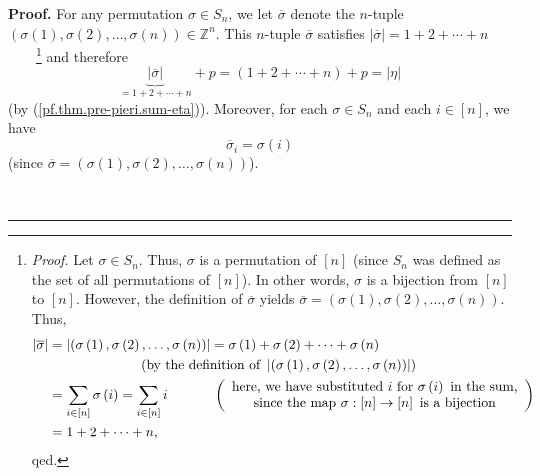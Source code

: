 \documentclass[numbers=enddot,12pt,final,onecolumn,notitlepage,english]{scrartcl}%
\theoremstyle{definition}
\newenvironment{proof}[1][Proof]{\noindent\textbf{#1.} }{\ \rule{0.5em}{0.5em}}
\let\sumnonlimits\sum
\renewcommand{\sum}{\sumnonlimits\limits}
\newenvironment{verlong}{}{}
\begin{document}
\begin{verlong}
\begin{proof}
For any permutation $\sigma\in S_{n}$, we let $\overline{\sigma}$ denote the
$n$-tuple $\left(  \sigma\left(  1\right)  ,\sigma\left(  2\right)
,\ldots,\sigma\left(  n\right)  \right)  \in\mathbb{Z}^{n}$. This $n$-tuple
$\overline{\sigma}$ satisfies $\left\vert \overline{\sigma}\right\vert
=1+2+\cdots+n$\ \ \ \ \footnote{\textit{Proof.} Let $\sigma\in S_{n}$. Thus,
$\sigma$ is a permutation of $\left[  n\right]  $ (since $S_{n}$ was defined
as the set of all permutations of $\left[  n\right]  $). In other words,
$\sigma$ is a bijection from $\left[  n\right]  $ to $\left[  n\right]  $.
However, the definition of $\overline{\sigma}$ yields $\overline{\sigma
}=\left(  \sigma\left(  1\right)  ,\sigma\left(  2\right)  ,\ldots
,\sigma\left(  n\right)  \right)  $. Thus,%
\begin{align*}
\left\vert \overline{\sigma}\right\vert  &  =\left\vert \left(  \sigma\left(
1\right)  ,\sigma\left(  2\right)  ,\ldots,\sigma\left(  n\right)  \right)
\right\vert =\sigma\left(  1\right)  +\sigma\left(  2\right)  +\cdots
+\sigma\left(  n\right) \\
&  \ \ \ \ \ \ \ \ \ \ \ \ \ \ \ \ \ \ \ \ \left(  \text{by the definition of
}\left\vert \left(  \sigma\left(  1\right)  ,\sigma\left(  2\right)
,\ldots,\sigma\left(  n\right)  \right)  \right\vert \right) \\
&  =\sum_{i\in\left[  n\right]  }\sigma\left(  i\right)  =\sum_{i\in\left[
n\right]  }i\ \ \ \ \ \ \ \ \ \ \left(
\begin{array}
[c]{c}%
\text{here, we have substituted }i\text{ for }\sigma\left(  i\right)  \text{
in the sum,}\\
\text{since the map }\sigma:\left[  n\right]  \rightarrow\left[  n\right]
\text{ is a bijection}%
\end{array}
\right) \\
&  =1+2+\cdots+n,
\end{align*}
qed.} and therefore
\begin{equation}
\underbrace{\left\vert \overline{\sigma}\right\vert }_{=1+2+\cdots
+n}+p=\left(  1+2+\cdots+n\right)  +p=\left\vert \eta\right\vert
\label{pf.thm.pre-pieri.modsigbar1}%
\end{equation}
(by (\ref{pf.thm.pre-pieri.sum-eta})). Moreover, for each $\sigma\in S_{n}$
and each $i\in\left[  n\right]  $, we have%
\begin{equation}
\overline{\sigma}_{i}=\sigma\left(  i\right)  \label{pf.thm.pre-pieri.sigbari}%
\end{equation}
(since $\overline{\sigma}=\left(  \sigma\left(  1\right)  ,\sigma\left(
2\right)  ,\ldots,\sigma\left(  n\right)  \right)  $).


\end{proof}
\end{verlong}
\end{document}
